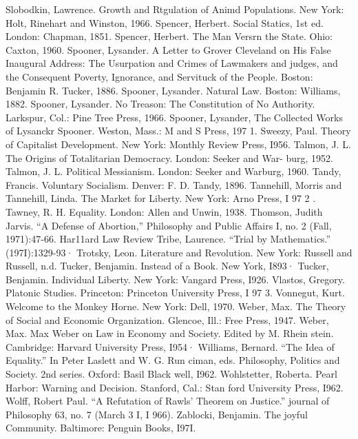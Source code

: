 \documentclass[11pt,openany]{book}
\begin{document}
{Slobodkin, Lawrence. Growth and Rtgulation of Animd Populations. New York: Holt, Rinehart and Winston, 1966. Spencer, Herbert. Social Statics, 1st ed. London: Chapman, 1851. Spencer, Herbert. The Man Versrn the State. Ohio: Caxton, 1960. Spooner, Lysander. A Letter to Grover Cleveland on His False Inaugural Address: The Usurpation and Crimes of Lawmakers and judges, and the Consequent Poverty, Ignorance, and Servituck of the People. Boston: Benjamin R. Tucker, 1886. Spooner, Lysander. Natural Law. Boston: Williams, 1882. Spooner, Lysander. No Treason: The Constitution of No Authority. Larkspur, Col.: Pine Tree Press, 1966. Spooner, Lysander, The Collected Works of Lysanckr Spooner. Weston, Mass.: M and S Press, 197 1. Sweezy, Paul. Theory of Capitalist Development. New York: Monthly Review Press, I956. Talmon, J. L. The Origins of Totalitarian Democracy. London: Seeker and War- burg, 1952. Talmon, J. L. Political Messianism. London: Seeker and Warburg, 1960. Tandy, Francis. Voluntary Socialism. Denver: F. D. Tandy, 1896. Tannehill, Morris and Tannehill, Linda. The Market for Liberty. New York: Arno Press, I 97 2 . Tawney, R. H. Equality. London: Allen and Unwin, 1938. Thomson, Judith Jarvis. ``A Defense of Abortion,'' Philosophy and Public Affairs I, no. 2 (Fall, 1971):47-66. Har11ard Law Review Tribe, Laurence. ``Trial by Mathematics.'' (197I):1329-93· Trotsky, Leon. Literature and Revolution. New York: Russell and Russell, n.d. Tucker, Benjamin. Instead of a Book. New York, I893· Tucker, Benjamin. Individual Liberty. New York: Vangard Press, I926. Vlastos, Gregory. Platonic Studies. Princeton: Princeton University Press, I 97 3. Vonnegut, Kurt. Welcome to the Monkey Horne. New York: Dell, 1970. Weber, Max. The Theory of Social and Economic Organization. Glencoe, Ill.: Free Press, 1947. Weber, Max. Max Weber on Law in Economy and Society. Edited by M. Rhein stein. Cambridge: Harvard University Press, I954· Williams, Bernard. ``The Idea of Equality.'' In Peter Laslett and W. G. Run ciman, eds. Philosophy, Politics and Society. 2nd series. Oxford: Basil Black well, I962. Wohlstetter, Roberta. Pearl Harbor: Warning and Decision. Stanford, Cal.: Stan ford University Press, I962. Wolff, Robert Paul. ``A Refutation of Rawls' Theorem on Justice.'' journal of Philosophy 63, no. 7 (March 3 I, I 966). Zablocki, Benjamin. The joyful Community. Baltimore: Penguin Books, I97I.\par

}
\end{document}
